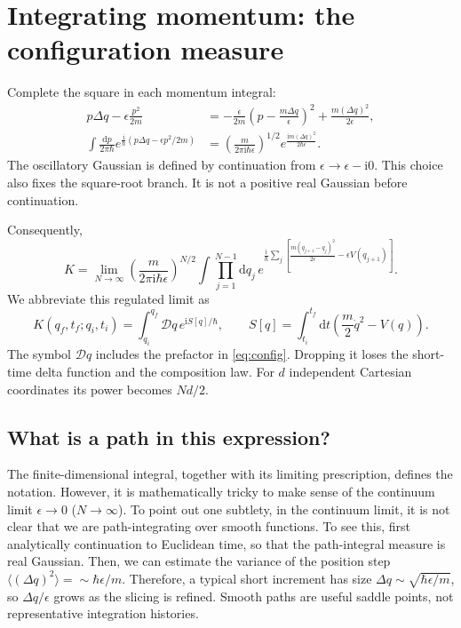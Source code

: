 \documentclass[11pt]{article}
\newcommand{\dd}{\mathrm d}
\newcommand{\ii}{\mathrm i}
\newcommand{\D}{\mathcal D}
\newcommand{\module}[1]{\clearpage\section{#1}}
\begin{document}
\module{Integrating momentum: the configuration measure}
Complete the square in each momentum integral:
\begin{align}
 p\Delta q-\epsilon\frac{p^2}{2m}
 &=-\frac{\epsilon}{2m}\left(p-\frac{m\Delta q}{\epsilon}\right)^2
   +\frac{m(\Delta q)^2}{2\epsilon},\\
 \int\frac{\dd p}{2\pi\hbar}
 e^{\frac{\ii}{\hbar}(p\Delta q-\epsilon p^2/2m)}
 &=\left(\frac{m}{2\pi\ii\hbar\epsilon}\right)^{1/2}
 e^{\frac{\ii m(\Delta q)^2}{2\hbar\epsilon}}.       \label{eq:gaussian}
\end{align}
The oscillatory Gaussian is defined by continuation from
\(\epsilon\to\epsilon-\ii0\). This choice also fixes the square-root
branch. It is not a positive real Gaussian before continuation.

Consequently,
\begin{equation}
 K=\lim_{N\to\infty}\left(\frac{m}{2\pi\ii\hbar\epsilon}\right)^{N/2}
 \int\prod_{j=1}^{N-1}\dd q_j\,
 e^{\frac{\ii}{\hbar}\sum_j
 [\frac{m(q_{j+1}-q_j)^2}{2\epsilon}-\epsilon V(q_{j+1})]}.
                                                        \label{eq:config}
\end{equation}
We abbreviate this regulated limit as
\begin{equation}
 K(q_f,t_f;q_i,t_i)=\int_{q_i}^{q_f}\D q\,
 e^{\ii S[q]/\hbar},\qquad
 S[q]=\int_{t_i}^{t_f}\dd t\left(\frac m2\dot q^2-V(q)\right).
\end{equation}
The symbol \(\D q\) includes the prefactor in \eqref{eq:config}.
Dropping it loses the short-time delta function and the composition law.
For \(d\) independent Cartesian coordinates its power becomes \(Nd/2\).

\subsection{What is a path in this expression?}
The finite-dimensional integral, together with its limiting prescription,
defines the notation. However, it is mathematically tricky to make sense of the continuum limit $\epsilon\to 0$ ($N\to \infty$). To point out one subtlety, in the continuum limit, it is not clear that we are path-integrating over smooth functions. To see this, first analytically continuation to Euclidean time, so that the path-integral measure is real Gaussian. Then, we can estimate the variance of the position step $\langle (\Delta q)^2\rangle=\sim \hbar \epsilon/m$. Therefore, 
a
typical short increment has size \(\Delta q\sim\sqrt{\hbar\epsilon/m}\),
so \(\Delta q/\epsilon\) grows as the slicing is refined. Smooth paths
are useful saddle points, not representative integration histories.
\end{document}
